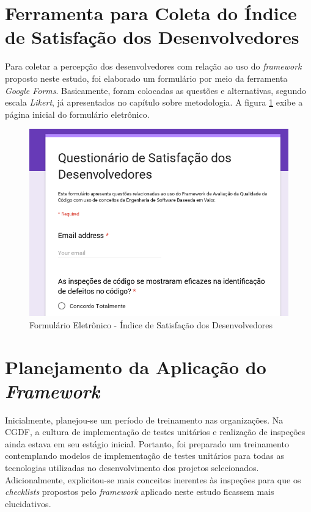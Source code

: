 \section{Ferramenta para Coleta do Índice de Satisfação dos Desenvolvedores}

Para coletar a percepção dos desenvolvedores com relação ao uso do \textit{framework} proposto neste estudo, foi elaborado um formulário por meio da ferramenta \textit{Google Forms}. Basicamente, foram colocadas as questões e alternativas, segundo escala \textit{Likert}, já apresentados no capítulo sobre metodologia. A figura \ref{fig:questionario} exibe a página inicial do formulário eletrônico.

\begin{figure}[h]
\includegraphics[width=\textwidth]{figuras/questionario.png}
\caption{Formulário Eletrônico - Índice de Satisfação dos Desenvolvedores}
\label{fig:questionario}
\end{figure}

\section{Planejamento da Aplicação do \textit{Framework}}

Inicialmente, planejou-se um período de treinamento nas organizações. Na CGDF, a cultura de implementação de testes unitários e realização de inspeções ainda estava em seu estágio inicial. Portanto, foi preparado um treinamento contemplando modelos de implementação de testes unitários para todas as tecnologias utilizadas no desenvolvimento dos projetos selecionados. Adicionalmente, explicitou-se mais conceitos inerentes às inspeções para que os \textit{checklists} propostos pelo \textit{framework} aplicado neste estudo ficassem mais elucidativos.

